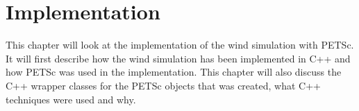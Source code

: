 \chapter{Implementation}

This chapter will look at the implementation of the wind simulation with PETSc.
It will first describe how the wind simulation has been implemented in C++ and
how PETSc was used in the implementation. This chapter will also discuss the
C++ wrapper classes for the PETSc objects that was created, what C++
techniques were used and why.




